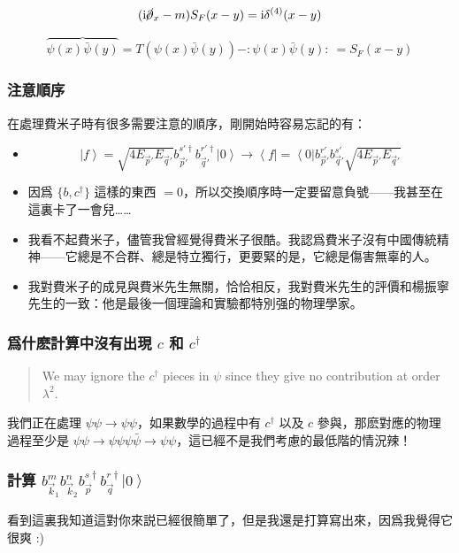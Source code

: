 \documentclass{article}
\begin{document}
$$
  (\mathrm{i}\cancel{\partial}_x-m)S_F(x-y)=\mathrm{i}\delta^{(4)}(x-y)
$$

$$
  \overbrace{\psi(x)\bar\psi(y)}=T(\psi(x)\bar\psi(y))-:\psi(x)\bar\psi(y):\ =S_F(x-y)
$$

\subsubsection{注意順序}

在處理費米子時有很多需要注意的順序，剛開始時容易忘記的有：

\begin{itemize}
  \item $$\left|f\right\rangle=\sqrt{4E_{\vec{p}'}E_{\vec{q}'}}b_{\vec{p}'}^{s'\dagger}b_{\vec{q}'}^{r'\dagger}\left|0\right\rangle\to\left\langle f\right|=\left\langle 0\right|b_{\vec{p}'}^{r'}b_{\vec{q}'}^{s'}\sqrt{4E_{\vec{p}'}E_{\vec{q}'}}
        $$
  \item 因爲 $\{b,c^{\dagger}\}$ 這樣的東西 $=0$，所以交換順序時一定要留意負號——我甚至在這裏卡了一會兒……
  \item 我看不起費米子，儘管我曾經覺得費米子很酷。我認爲費米子沒有中國傳統精神——它總是不合群、總是特立獨行，更要緊的是，它總是傷害無辜的人。
  \item 我對費米子的成見與費米先生無關，恰恰相反，我對費米先生的評價和楊振寧先生的一致：他是最後一個理論和實驗都特別强的物理學家。
\end{itemize}

\subsubsection{爲什麽計算中沒有出現 $c$ 和 $c^{\dagger}$}

\begin{quote}
  We may ignore the $c^{\dagger}$ pieces in $\psi$ since they give no contribution at order $\lambda^2$.
\end{quote}

我們正在處理 $\psi\psi\to\psi\psi$，如果數學的過程中有 $c^{\dagger}$ 以及 $c$ 參與，那麽對應的物理過程至少是 $\psi\psi\to\psi\psi\psi\bar{\psi}\to\psi\psi$，這已經不是我們考慮的最低階的情況辣！

\subsubsection{計算 $b_{\vec{k}_1}^mb_{\vec{k}_2}^nb_{\vec{p}}^{s\dagger}b_{\vec{q}}^{r\dagger}\left|0\right\rangle$}

看到這裏我知道這對你來説已經很簡單了，但是我還是打算寫出來，因爲我覺得它很爽 :)
\end{document}
